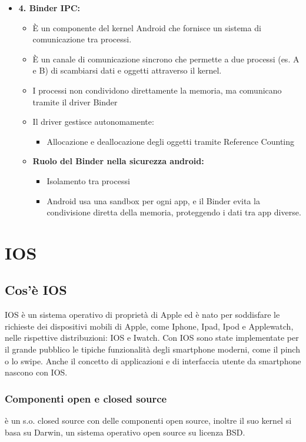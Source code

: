 \documentclass{report}
\begin{document}
\begin{itemize}
\item \textbf{4. Binder IPC:}
\begin{itemize}
    \item \`E un componente del kernel Android che fornisce un sistema di comunicazione tra processi.
    \item \`E un canale di comunicazione sincrono che permette a due processi (es. A e B) di scambiarsi dati e oggetti attraverso il kernel.
    \item I processi non condividono direttamente la memoria, ma comunicano tramite il driver Binder
    \item Il driver gestisce autonomamente:
    \begin{itemize}
        \item Allocazione e deallocazione degli oggetti tramite Reference Counting
    \end{itemize}
    \item \textbf{Ruolo del Binder nella sicurezza android:}
    \begin{itemize}
        \item Isolamento tra processi
        \item Android usa una sandbox per ogni app, e il Binder evita la condivisione diretta della memoria, proteggendo i dati tra app diverse.
    \end{itemize}
\end{itemize}

\end{itemize}


\chapter{IOS}
\section{Cos'è IOS}
IOS è un sistema operativo di proprietà di Apple ed è nato per soddisfare le richieste dei dispositivi mobili di Apple, come Iphone, Ipad, Ipod e Applewatch, nelle rispettive distribuzioni: IOS e Iwatch.
Con IOS sono state implementate per il grande pubblico le tipiche funzionalità degli smartphone moderni, come il pinch o lo swipe. Anche il concetto di applicazioni e di interfaccia utente da smartphone nascono con IOS.
\subsection{Componenti open e closed source}
è un s.o. closed source con delle componenti open source, inoltre il suo kernel si basa su Darwin, un sistema operativo open source su licenza BSD.
\end{document}
